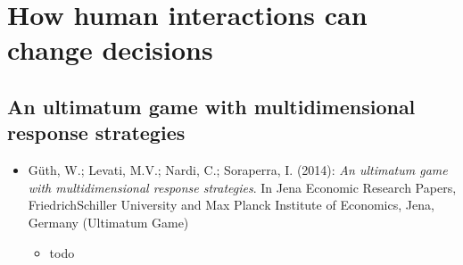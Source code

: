 
\chapter{How human interactions can change decisions}

\section{An ultimatum game with multidimensional response strategies} 

\begin{itemize}
	\item Güth, W.; Levati, M.V.; Nardi, C.; Soraperra, I. (2014): \textit{An ultimatum game with multidimensional response strategies}. In Jena Economic Research Papers, FriedrichSchiller University and Max Planck Institute of Economics, Jena, Germany (Ultimatum Game)
		\begin{itemize}
			\item todo
		\end{itemize}
\end{itemize}